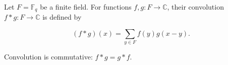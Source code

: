 Let $F = \mathbb{F}_q$ be a finite field. For functions $f, g: F \to \mathbb{C}$, their convolution $f * g: F \to \mathbb{C}$ is defined by

$$(f * g)(x) = \sum_{y \in F} f(y) g(x - y).$$

Convolution is commutative: $f * g = g * f$.

